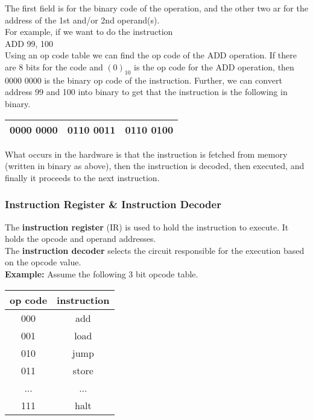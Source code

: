 \documentclass[]{article}
\begin{document}
The first field is for the binary code of the operation, and the other two ar for the address of the 1st and/or 2nd operand(s).\\

For example, if we want to do the instruction \\

ADD 99, 100\\

Using an op code table we can find the op code of the ADD operation. If there are 8 bits for the code and $(0)_{10}$ is the op code for the ADD operation, then 0000 0000 is the binary op code of the instruction. Further, we can convert address 99 and 100 into binary to get that the instruction is the following in binary.

\begin{center}
	\begin{tabular}{|c|c|c|}\hline
		0000 0000 & 0110 0011 & 0110 0100 \\\hline
	\end{tabular}
	\bigbreak
\end{center}

What occurs in the hardware is that the instruction is fetched from memory (written in binary as above), then the instruction is decoded, then executed, and finally it proceeds to the next instruction.\\

\subsubsection{Instruction Register \& Instruction Decoder}
\bigbreak

The \textbf{instruction register} (IR) is used to hold the instruction to execute. It holds the opcode and operand addresses.\\

The \textbf{instruction decoder} selects the circuit responsible for the execution based on the opcode value. \\

\textbf{Example: } Assume the following 3 bit opcode table.

\begin{center}
	\begin{tabular}{|c|c|}\hline
		op code & instruction \\\hline
		000 & add \\\hline
		001 & load \\\hline
		010 & jump \\\hline
		011 & store \\\hline
		... & ... \\\hline
		111 & halt \\\hline
	\end{tabular}
	\bigbreak
\end{center}
\end{document}
